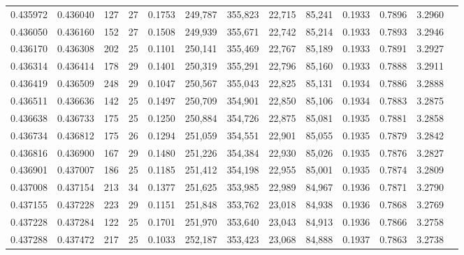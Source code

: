 \begin{tabular}{rrrrrrrrrrrrr}
0.435972 & 0.436040 & 127 &  27 &                                     0.1753 & 249,787 & 355,823 &  22,715 &  85,241 & 0.1933 & 0.7896 & 3.2960 \\
0.436050 & 0.436160 & 152 &  27 &                                     0.1508 & 249,939 & 355,671 &  22,742 &  85,214 & 0.1933 & 0.7893 & 3.2946 \\
0.436170 & 0.436308 & 202 &  25 &                                     0.1101 & 250,141 & 355,469 &  22,767 &  85,189 & 0.1933 & 0.7891 & 3.2927 \\
0.436314 & 0.436414 & 178 &  29 &                                     0.1401 & 250,319 & 355,291 &  22,796 &  85,160 & 0.1933 & 0.7888 & 3.2911 \\
0.436419 & 0.436509 & 248 &  29 &                                     0.1047 & 250,567 & 355,043 &  22,825 &  85,131 & 0.1934 & 0.7886 & 3.2888 \\
0.436511 & 0.436636 & 142 &  25 &                                     0.1497 & 250,709 & 354,901 &  22,850 &  85,106 & 0.1934 & 0.7883 & 3.2875 \\
0.436638 & 0.436733 & 175 &  25 &                                     0.1250 & 250,884 & 354,726 &  22,875 &  85,081 & 0.1935 & 0.7881 & 3.2858 \\
0.436734 & 0.436812 & 175 &  26 &                                     0.1294 & 251,059 & 354,551 &  22,901 &  85,055 & 0.1935 & 0.7879 & 3.2842 \\
0.436816 & 0.436900 & 167 &  29 &                                     0.1480 & 251,226 & 354,384 &  22,930 &  85,026 & 0.1935 & 0.7876 & 3.2827 \\
0.436901 & 0.437007 & 186 &  25 &                                     0.1185 & 251,412 & 354,198 &  22,955 &  85,001 & 0.1935 & 0.7874 & 3.2809 \\
0.437008 & 0.437154 & 213 &  34 &                                     0.1377 & 251,625 & 353,985 &  22,989 &  84,967 & 0.1936 & 0.7871 & 3.2790 \\
0.437155 & 0.437228 & 223 &  29 &                                     0.1151 & 251,848 & 353,762 &  23,018 &  84,938 & 0.1936 & 0.7868 & 3.2769 \\
0.437228 & 0.437284 & 122 &  25 &                                     0.1701 & 251,970 & 353,640 &  23,043 &  84,913 & 0.1936 & 0.7866 & 3.2758 \\
0.437288 & 0.437472 & 217 &  25 &                                     0.1033 & 252,187 & 353,423 &  23,068 &  84,888 & 0.1937 & 0.7863 & 3.2738 \\

\end{tabular}
